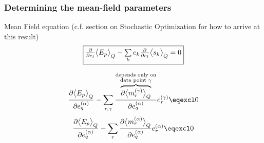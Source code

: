 \subsubsection{Determining the mean-field parameters}


\begin{frame}[t] 
\begin{block}{Mean Field equation (c.f. section on Stochastic Optimization for how to arrive at this result)}
\begin{equation}
	\fbox{$ \frac{\partial}{\partial e_l}\big<E_p\big>_Q 
		- \sum\limits_k e_k \frac{\partial}{\partial e_l} \big<s_k\big>_Q = 0
	$}
\end{equation}
\end{block}
\begin{equation}	\frac{\partial \big< E_p \big>_Q}{\partial e_q^{(\alpha)}}
	- \sum\limits_{r, \gamma} \frac{
		\overbrace{ \partial \big< m_r^{(\gamma)} \big>_Q }^{
			\substack{	\text{depends only on} \\
					\text{data point } \gamma }}}{
			\partial e_q^{(\alpha)}}
		e_r^{(\gamma)} \eqexcl 0
\end{equation}
\begin{equation}
	\frac{\partial \big< E_p \big>_Q}{\partial e_q^{(\alpha)}}
	- \sum\limits_r \frac{\partial \big< m_r^{(\alpha)} \big>_Q}{
		\partial e_q^{(\alpha)}}
		e_r^{(\alpha)} \eqexcl 0
\end{equation}

\end{frame}


